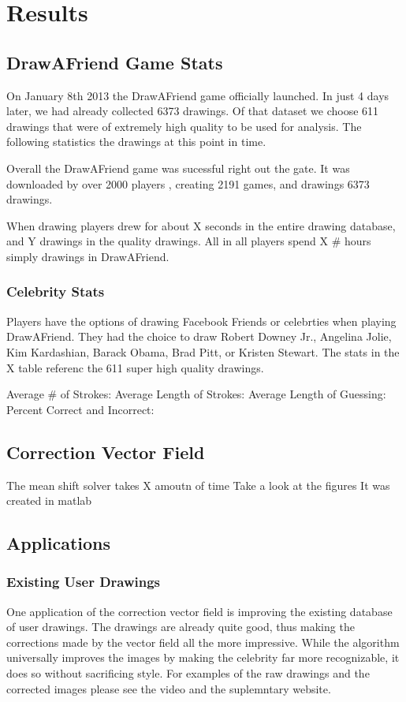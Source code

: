 \section{Results}
\subsection{DrawAFriend Game Stats}
On January 8th 2013 the DrawAFriend game officially launched. In just 4 days later, we had already collected 6373 drawings. Of that dataset we choose 611 drawings that were of extremely high quality to be used for analysis.  The following statistics the drawings at this point in time. 

Overall the DrawAFriend game was sucessful right out the gate. It was downloaded by over 2000 players , creating 2191 games, and drawings 6373 drawings. 

When drawing players drew for about X seconds in the entire drawing database, and Y drawings in the quality drawings. All in all players spend X \# hours simply drawings in DrawAFriend.

\subsubsection{Celebrity Stats}
Players have the options of drawing Facebook Friends or celebrties when playing DrawAFriend. They had the choice to draw Robert Downey Jr., Angelina Jolie, Kim Kardashian, Barack Obama, Brad Pitt, or Kristen Stewart. The stats in the X table referenc the 611 super high quality drawings.

Average \# of Strokes:
Average Length of Strokes:
Average Length of Guessing: 
Percent Correct and Incorrect: 

\subsection {Correction Vector Field}
The mean shift solver takes X amoutn of time 
Take a look at the figures
It was created in matlab

\subsection {Applications}
\subsubsection{Existing User Drawings}
One application of the correction vector field is improving the existing database of user drawings. The drawings are already quite good, thus making the corrections made by the vector field all the more impressive.  While the algorithm universally improves the images by making the celebrity far more recognizable, it does so without sacrificing style. For examples of the raw drawings and the corrected images please see the video and the suplemntary website.

